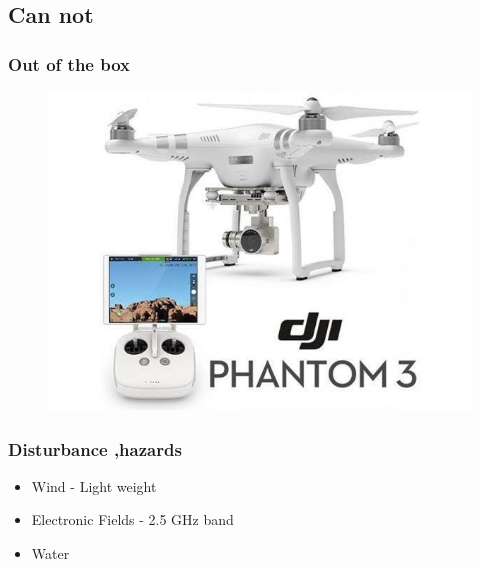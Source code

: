 \subsection{Can not}

\begin{frame}
\frametitle{Out of the box}

  \begin{figure}
  \includegraphics[scale=0.5]{pic/03_our-copter/phantom3.jpg}
  \end{figure}
  
\end{frame}



\begin{frame}
\frametitle{Disturbance ,hazards}

  \begin{itemize}
    \item Wind - Light weight
    \item Electronic Fields - 2.5 GHz band
	\item Water
  \end{itemize}
    
\end{frame}



